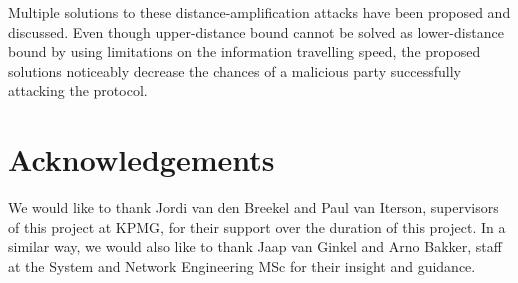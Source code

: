 \documentclass{article}
\begin{document}
Multiple solutions to these distance-amplification attacks have been proposed and discussed. Even though upper-distance bound cannot be solved as lower-distance bound by using limitations on the information travelling speed, the proposed solutions noticeably decrease the chances of a malicious party successfully attacking the protocol.




















\section{Acknowledgements}
\label{sec:acknowledgements}

We would like to thank Jordi van den Breekel and Paul van Iterson, supervisors of this project at KPMG, for their support over the duration of this project. In a similar way, we would also like to thank Jaap van Ginkel and Arno Bakker, staff at the System and Network Engineering MSc for their insight and guidance.







\printbibliography


\end{document}
